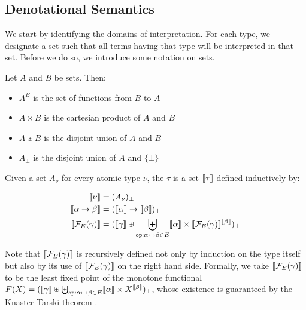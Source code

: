 \subsection{Denotational Semantics}
\label{ssec:denotational-semantics}

We start by identifying the domains of interpretation. For each type, we
designate a set such that all terms having that type will be interpreted in
that set. Before we do so, we introduce some notation on sets.

\begin{notation}
  Let $A$ and $B$ be sets. Then:

  \begin{itemize}
  \item $A^B$ is the set of functions from $B$ to $A$
  \item $A \times B$ is the cartesian product of $A$ and $B$
  \item $A \uplus B$ is the disjoint union of $A$ and $B$
  \item $A_\bot$ is the disjoint union of $A$ and $\{\bot\}$
  \end{itemize}
\end{notation}

\begin{definition}\label{def:type-domains}
  Given a set $A_\nu$ for every atomic type $\nu$, the
   $\tau$ is a set $\llbracket \tau \rrbracket$ defined
  inductively by:
  
  \begin{align*}
    \llbracket \nu \rrbracket &= (A_\nu)_\bot \\
    \llbracket \alpha \to \beta \rrbracket &= (\llbracket \alpha \rrbracket \to \llbracket \beta \rrbracket)_\bot \\
    \llbracket \mathcal{F}_E(\gamma) \rrbracket &=
      (\llbracket \gamma \rrbracket \uplus \biguplus_{\mathtt{op} : \alpha \rightarrowtail \beta \in E} \llbracket \alpha \rrbracket \times \llbracket \mathcal{F}_E(\gamma) \rrbracket^{\llbracket \beta \rrbracket})_\bot
  \end{align*}
  
  Note that $\llbracket \mathcal{F}_E(\gamma) \rrbracket$ is recursively defined not only by
  induction on the type itself but also by its use of $\llbracket \mathcal{F}_E(\gamma) \rrbracket$
  on the right hand side. Formally, we take $\llbracket \mathcal{F}_E(\gamma) \rrbracket$ to be the
  least fixed point of the monotone functional
  $F(X) = (\llbracket \gamma \rrbracket \uplus \biguplus_{\mathtt{op} : \alpha \rightarrowtail \beta \in
    E} \llbracket \alpha \rrbracket \times X^{\llbracket \beta \rrbracket})_\bot$, whose existence is
  guaranteed by the Knaster-Tarski theorem
  \cite{knaster1928theoreme,tarski1955lattice}.
\end{definition}

